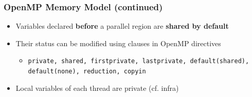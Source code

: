 \documentclass{beamer}
\begin{document}
\begin{frame}
  \frametitle{OpenMP Memory Model (continued)}

  \begin{itemize}

  \item Variables declared \textbf{before} a parallel region are
    \textbf{shared by default}

      \medskip
      
    \item Their status can be modified using \alert{clauses} in OpenMP directives
      \begin{itemize}
      \item {\tt private, shared, firstprivate, lastprivate, default(shared),
          default(none), reduction, copyin}
      \end{itemize}

      \medskip
      
    \item Local variables of each thread are private (cf. infra)
      
    \end{itemize}  
\end{frame}
\end{document}
